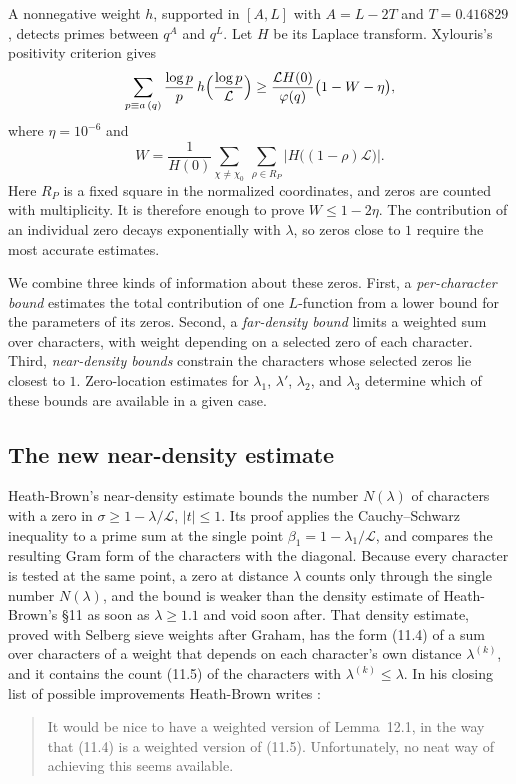 \documentclass[11pt]{amsart}
\numberwithin{equation}{section}
\theoremstyle{plain}
\theoremstyle{definition}
\theoremstyle{remark}
\newcommand{\LL}{\mathcal{L}}
\newcommand{\1}{\mathbf{1}}
\begin{document}
A nonnegative weight $h$, supported in $[A,L]$ with $A=L-2T$ and $T=0.416829$, detects
primes between $q^A$ and $q^L$. Let $H$ be its Laplace transform. Xylouris's positivity
criterion \cite[(3.57)]{Xylouris2011nullstellen} gives
\[
  \sum_{p\equiv a\,(q)}\frac{\log p}{p}\,h\Bigl(\frac{\log p}{\LL}\Bigr)
  \ge \frac{\LL H(0)}{\varphi(q)}\bigl(1-W-\eta\bigr),
\]
where $\eta=10^{-6}$ and
\[
  W=\frac1{H(0)}\sum_{\chi\ne\chi_0}\ \sum_{\rho\in R_P}
       \bigl|H\bigl((1-\rho)\LL\bigr)\bigr|.
\]
Here $R_P$ is a fixed square in the normalized coordinates, and zeros are counted with
multiplicity. It is therefore enough to prove $W\le1-2\eta$. The contribution of an
individual zero decays exponentially with $\lambda$, so zeros close to $1$ require the
most accurate estimates.

We combine three kinds of information about these zeros. First, a \emph{per-character
bound} estimates the total contribution of one $L$-function from a lower bound for the
parameters of its zeros. Second, a \emph{far-density bound} limits a weighted sum over
characters, with weight depending on a selected zero of each character. Third,
\emph{near-density bounds} constrain the characters whose selected zeros lie closest to
$1$. Zero-location estimates for $\lambda_1$, $\lambda'$, $\lambda_2$, and $\lambda_3$ determine
which of these bounds are available in a given case.

\subsection{The new near-density estimate}\label{subsec:newlemma}
Heath-Brown's near-density estimate \cite[Lemma~12.1]{HeathBrown1992zero} bounds the number
$N(\lambda)$ of characters with a zero in $\sigma\ge1-\lambda/\LL$, $|t|\le1$. Its proof applies
the Cauchy--Schwarz inequality to a prime sum at the single point $\beta_1=1-\lambda_1/\LL$, and
compares the resulting Gram form of the characters with the diagonal. Because every character
is tested at the same point, a zero at distance $\lambda$ counts only through the single number
$N(\lambda)$, and the bound is weaker than the density estimate of Heath-Brown's \S11 as soon as
$\lambda\ge1.1$ and void soon after. That density estimate, proved with Selberg sieve weights
after Graham, has the form (11.4) of a sum over characters of a weight that depends on each
character's own distance $\lambda^{(k)}$, and it contains the count (11.5) of the characters with
$\lambda^{(k)}\le\lambda$. In his closing list of possible improvements Heath-Brown writes
\cite[\S16, item~9]{HeathBrown1992zero}:
\begin{quote}
It would be nice to have a weighted version of Lemma~12.1, in the way that (11.4) is a
weighted version of (11.5). Unfortunately, no neat way of achieving this seems available.
\end{quote}
\end{document}
